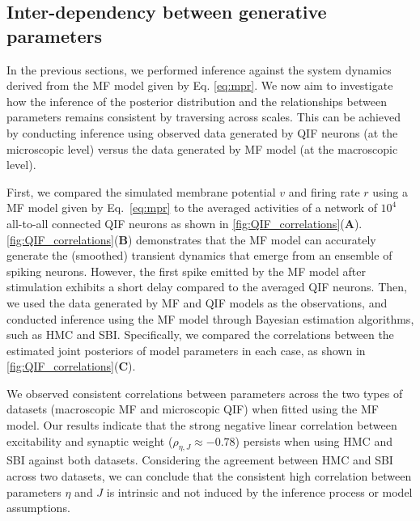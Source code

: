 \documentclass[preprint,11pt,authoryear]{elsarticle}
\begin{document}
\subsection{Inter-dependency between generative parameters}

In the previous sections, we performed inference against the system dynamics derived from the MF model given by Eq. \eqref{eq:mpr}. We now aim to investigate how the inference of the posterior distribution and the relationships between parameters remains consistent by traversing across scales. This can be achieved by conducting inference using observed data generated by QIF neurons (at the microscopic level) versus the data generated by MF model (at the macroscopic level).

First, we compared the simulated membrane potential $v$ and firing rate $r$ using a MF model given by Eq.~\eqref{eq:mpr} to the averaged activities of a network of $10^4$ all-to-all connected QIF neurons as shown in \autoref{fig:QIF_correlations}(\textbf{A}). \autoref{fig:QIF_correlations}(\textbf{B}) demonstrates that the MF model can accurately generate the (smoothed) transient dynamics that emerge from an ensemble of spiking neurons. However, the first spike emitted by the MF model after stimulation exhibits a short delay compared to the averaged QIF neurons. %
Then, we used the data generated by MF and QIF models as the observations, and conducted inference using the MF model through Bayesian estimation algorithms, such as HMC and SBI. Specifically, we compared the correlations between the estimated joint posteriors of model parameters in each case, as shown in \autoref{fig:QIF_correlations}(\textbf{C}). 

We observed consistent correlations between parameters across the two types of datasets (macroscopic MF and microscopic QIF) when fitted using the MF model. Our results indicate that the strong negative linear correlation between excitability and synaptic weight ($\rho_{\eta, J} \approx -0.78$) persists when using HMC and SBI against both datasets. Considering the agreement between HMC and SBI across two datasets, we can conclude that the consistent high correlation between parameters $\eta$ and $J$ is intrinsic and not induced by the inference process or model assumptions.
\end{document}
